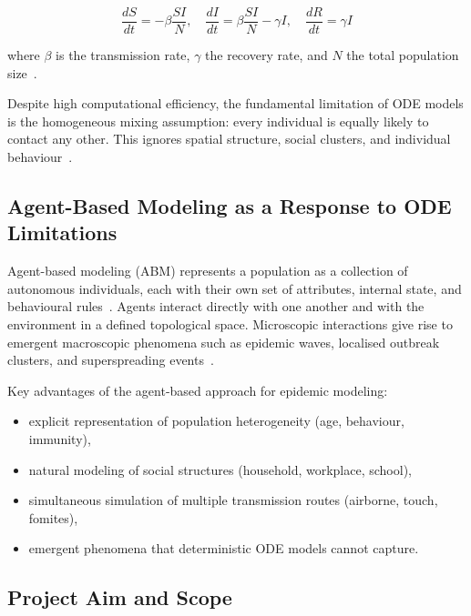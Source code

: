 \documentclass[english]{projectreport}
\begin{document}
\begin{equation}
  \frac{dS}{dt} = -\beta \frac{SI}{N}, \quad
  \frac{dI}{dt} = \beta \frac{SI}{N} - \gamma I, \quad
  \frac{dR}{dt} = \gamma I
  \label{eq:sir}
\end{equation}

\noindent where $\beta$ is the transmission rate, $\gamma$ the recovery rate,
and $N$ the total population size~\cite{brauer2008compartmental}.

Despite high computational efficiency, the fundamental limitation of ODE
models is the homogeneous mixing assumption: every individual is equally
likely to contact any other. This ignores spatial structure, social clusters,
and individual behaviour~\cite{eubank2004modelling}.

\subsection{Agent-Based Modeling as a Response to ODE Limitations}
\label{sec:abm-motivation}

Agent-based modeling (ABM) represents a population as a collection of
autonomous individuals, each with their own set of attributes, internal state,
and behavioural rules~\cite{bonabeau2002agent}. Agents interact directly with
one another and with the environment in a defined topological space.
Microscopic interactions give rise to emergent macroscopic phenomena such as
epidemic waves, localised outbreak clusters, and superspreading
events~\cite{willem2017lessons}.

Key advantages of the agent-based approach for epidemic modeling:

\begin{itemize}
  \item explicit representation of population heterogeneity (age, behaviour,
        immunity),
  \item natural modeling of social structures (household, workplace, school),
  \item simultaneous simulation of multiple transmission routes (airborne,
        touch, fomites),
  \item emergent phenomena that deterministic ODE models cannot capture.
\end{itemize}

\subsection{Project Aim and Scope}
\label{sec:goal}
\end{document}
